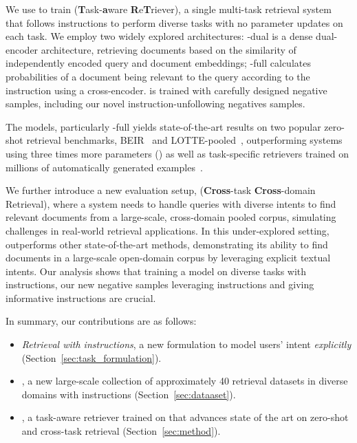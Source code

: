 {
{
We use \rib to train \model (\textbf{T}ask-\textbf{a}ware \textbf{R}e\textbf{T}riever), a single multi-task retrieval system 
that follows instructions to perform diverse tasks with no parameter updates on each task. 
}}
We employ two widely explored architectures: 
\model-dual is a dense dual-encoder architecture, retrieving documents based on the similarity of independently encoded query and document embeddings; \model-full calculates probabilities of a document being relevant to the query according to the instruction using a cross-encoder. 
\model is trained with carefully designed negative samples, including our novel {instruction-unfollowing negatives samples}.

The \model models, particularly \model-full yields state-of-the-art results on two popular zero-shot retrieval benchmarks, BEIR~\cite{thakur2021beir} and LOTTE-pooled~\cite{santhanam-etal-2022-colbertv2}, outperforming systems using three times more parameters (\citealt{nogueira-etal-2020-document, ni2021large, muennighoff2022sgpt}) as well as task-specific retrievers trained on millions of automatically generated examples~\cite{promptagator,wang-etal-2022-gpl}.

We further introduce a new evaluation setup, \task ({\bf Cross}-task {\bf Cross}-domain Retrieval), where a system needs to handle queries with diverse intents to find relevant documents from a large-scale, cross-domain pooled corpus{, simulating challenges in real-world retrieval applications.}
In this under-explored setting, \model outperforms other state-of-the-art methods, demonstrating its ability to find documents in a large-scale open-domain corpus by leveraging explicit textual intents. 
Our analysis shows that training a model on diverse tasks with instructions, {our new negative samples leveraging instructions} and giving informative instructions are crucial.

In summary, our contributions are as follows: 
\vspace{-0.1cm}
\begin{itemize}
\itemsep-0.2em 
\item \emph{Retrieval with instructions}, a new formulation to model users' intent {\it explicitly}
(Section~\ref{sec:task_formulation}). 
\item {\rib, a new large-scale collection of approximately 40 retrieval datasets in diverse domains with instructions (Section~\ref{sec:dataaset}). }
\item {\model, a task-aware retriever trained on \rib that advances state of the art on zero-shot and cross-task retrieval (Section~\ref{sec:method})}. 
\end{itemize}
